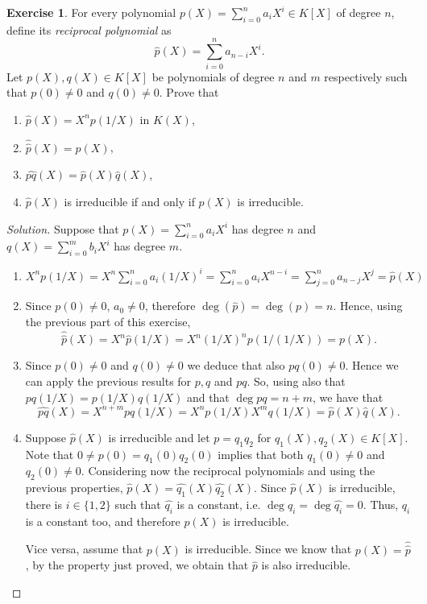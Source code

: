 \documentclass[a4paper,10pt,reqno]{amsart}
\theoremstyle{definition} %
\newtheorem{ex}{Exercise}[section]
\newenvironment{sol}
  {\renewcommand\qedsymbol{$\blacksquare$}\begin{proof}[Solution]}
  {\end{proof}}
\begin{document}
\begin{ex}
    
    For every polynomial $p(X)=\sum_{i=0}^n a_iX^i\in K[X]$ of degree $n$,
    define its \emph{reciprocal polynomial} as
    \[
    \widehat{p}(X)=\sum_{i=0}^n a_{n-i}X^i.
    \]
    Let $p(X),q(X)\in K[X]$ be polynomials of degree $n$ and $m$ respectively such that $p(0)\neq 0$ and $q(0)\neq 0$. Prove that
    \begin{enumerate}[label=(\roman*)]
    \item $\widehat{p}(X)=X^np(1/X)$ in $K(X)$,
    \item $\widehat{ \widehat{p}}(X)=p(X)$,
    \item $\widehat{pq}(X)=\widehat{p}(X)\widehat{q}(X)$,
    \item $\widehat{p}(X)$ is irreducible if and only if $p(X)$ is irreducible.
    \end{enumerate}
\end{ex}

\begin{sol}
Suppose that $p(X)=\sum_{i=0}^n a_iX^i$ has degree $n$ and $q(X)=\sum_{i=0}^m b_iX^i$ has degree $m$.
    \begin{enumerate}[label=(\roman*)]
    \item 
    $X^np(1/X)=X^n\sum_{i=0}^n a_i(1/X)^i=\sum_{i=0}^n a_iX^{n-i}=\sum_{j=0}^n a_{n-j}X^j=\widehat{p}(X)$
    \item Since $p(0)\neq 0$, $a_0\neq 0$, therefore $\deg(\widehat{p})=\deg(p)=n$. Hence, using the previous part of this exercise,
    \[
    \widehat{\widehat{p}}(X)=X^n\widehat{p}(1/X)=X^n(1/X)^np(1/(1/X))=p(X).
    \]    
    \item Since $p(0)\neq 0$ and $q(0)\neq 0$ we deduce that also $pq(0)\neq 0$.
    Hence we can apply the previous results for $p,q$ and $pq$. 
    So, using also that $pq(1/X)=p(1/X)q(1/X)$ and that $\deg{pq}=n+m$, we have that
    \[
    \widehat{pq}(X)=X^{n+m}pq(1/X)=X^np(1/X)X^mq(1/X)=\widehat{p}(X)\widehat{q}(X).
    \]
    \item Suppose $\widehat{p}(X)$ is irreducible and let $p=q_1q_2$ for
    $q_1(X),q_2(X)\in K[X]$.
    Note that $0\neq p(0)=q_1(0)q_2(0)$ implies that both $q_1(0)\neq 0$ and $q_2(0)\neq 0$.
    Considering now the reciprocal polynomials and using the previous properties,
    $\widehat{p}(X)=\widehat{q_1}(X)\widehat{q_2}(X)$.
    Since $\widehat{p}(X)$ is irreducible, there is $i\in\{1,2\}$ such that $\widehat{q_i}$ 
    is a constant, i.e. $\deg{q_i}=\deg{\widehat{q_i}}=0$.
    Thus, $q_i$ is a constant too, and therefore $p(X)$ is irreducible.

    Vice versa, assume that $p(X)$ is irreducible. Since we know that $p(X)=\widehat{\widehat{p}}$, by the property just proved, we obtain that $\widehat{p}$ 
    is also irreducible.
    \end{enumerate}
\end{sol}
\end{document}
